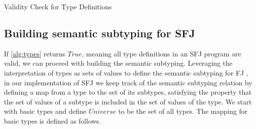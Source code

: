 \documentclass[runningheads]{llncs}
\begin{document}
\begin{algorithm}[t]
    \SetAlgoLined
    \caption{Validity Check for Type Definitions}
    \label{alg:types}

    \DontPrintSemicolon
    \BlankLine
\end{algorithm}

\subsection{Building semantic subtyping for SFJ}

If \autoref{alg:types} returns $True$, meaning all type definitions in an SFJ program are valid, we can proceed with building the semantic subtyping.
Leveraging the interpretation of types as sets of values to define the semantic subtyping for FJ \cite{Dardha2013,Dardha2017}, in our implementation of SFJ we keep track of the semantic subtyping relation by defining a map from a type to the set of its subtypes, satisfying the property that the set of values of a subtype is included in the set of values of the type.
We start with basic types and define $Universe$ to be the set of all types.
The mapping for basic types is defined as follows.
\end{document}
